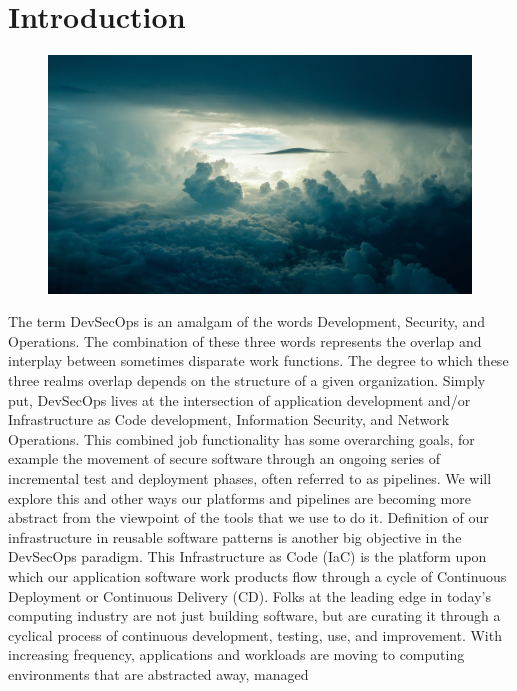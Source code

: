 \chapter{Introduction}
\begin{figure}[!htb]
\includegraphics{../images/sky-690293_1920.jpg}
\end{figure}
\justify{}
The term DevSecOps is an amalgam of the words
Development, Security, and Operations. The combination of these three words represents 
the overlap and interplay between
sometimes disparate work functions. The degree to which these three 
realms overlap depends on the structure of a given organization.
Simply put, DevSecOps lives at the intersection of
application development and/or Infrastructure as Code
development, Information Security, and Network Operations.
\justify{}
This combined job functionality has some overarching goals, for
example the movement of secure
software through an ongoing series of incremental test and deployment
phases, often referred to as pipelines. We will explore this and other
ways our platforms and pipelines
are becoming more abstract from the viewpoint of the tools that we use to do it.
Definition of our infrastructure in reusable software patterns is another big objective
in the DevSecOps paradigm. This Infrastructure as Code (IaC)
is the platform
upon which our application software work products flow through a cycle of Continuous
Deployment or Continuous Delivery (CD).
\justify{}
Folks at the leading edge in today's computing industry are not just building
software, but are curating it through a cyclical process of continuous development,
testing, use, and improvement. With increasing frequency, applications and
workloads are moving to computing environments that are abstracted away, managed

